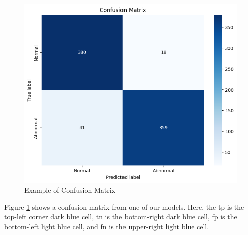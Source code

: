 \begin{figure}[ht!]
    \centering
    \includegraphics[width=1\linewidth]{Images/confusion matrix.png}
    \caption{Example of Confusion Matrix}
    \label{fig:confusion matrix}
\end{figure}

Figure \ref{fig:confusion matrix} shows a confusion matrix from one of our models. Here, the \gls{tp} is the top-left corner dark blue cell, \gls{tn} is the bottom-right dark blue cell, \gls{fp} is the bottom-left light blue cell, and \gls{fn} is the upper-right light blue cell.


